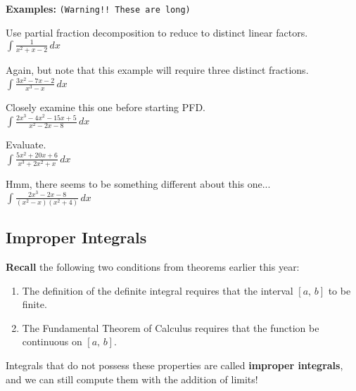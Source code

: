 \documentclass[addpoints, 12pt]{exam}
\begin{document}
\textbf{Examples:} \texttt{(Warning!! These are long)}
\begin{questions}
    \question Use partial fraction decomposition to reduce to distinct linear factors.\\
    $\displaystyle\int\frac{1}{x^2+x-2}\,dx$
    
    \newpage
    
    \question Again, but note that this example will require three distinct fractions.\\
    $\displaystyle\int\frac{3x^2-7x-2}{x^3-x}\,dx$
    
    \question Closely examine this one before starting PFD.\\
    $\displaystyle\int\frac{2x^3-4x^2-15x+5}{x^2-2x-8}\,dx$
    
    \newpage
    
    \question Evaluate.\\
    $\displaystyle\int\frac{5x^2+20x+6}{x^3+2x^2+x}\,dx$
    
    \newpage
    
    \question Hmm, there seems to be something different about this one...\\
    $\displaystyle\int\frac{2x^3-2x-8}{(x^2-x)(x^2+4)}\,dx$
    
\end{questions}



\newpage
{}
\subsection*{Improper Integrals}
\textbf{Recall} the following two conditions from theorems earlier this year:
\begin{enumerate}
    \item The definition of the definite integral requires that the interval $[a,\,b]$ to be finite.
    \item The Fundamental Theorem of Calculus requires that the function be continuous on $[a,\,b]$.
\end{enumerate}
Integrals that do not possess these properties are called \textbf{improper integrals}, and we can still compute them with the addition of limits!
\end{document}
